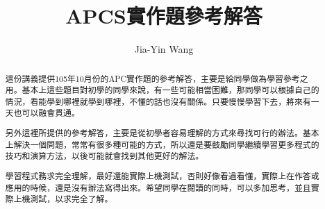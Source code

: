 \documentclass[12pt,a4paper]{article}
\begin{document}
\title{APCS實作題參考解答}
\author{Jia-Yin Wang}
\maketitle

\begin{abstract}
這份講義提供105年10月份的APC實作題的參考解答，主要是給同學做為學習參考之用。基本上這些題目對初學的同學來說，有一些可能相當困難，那同學可以根據自己的情況，看能學到哪裡就學到哪裡，不懂的話也沒有關係。只要慢慢學習下去，將來有一天也可以融會貫通。

另外這裡所提供的參考解答，主要是從初學者容易理解的方式來尋找可行的辦法。基本上解決一個問題，常常有很多種可能的方式，所以還是要鼓勵同學繼續學習更多程式的技巧和演算方法，以後可能就會找到其他更好的解法。

學習程式務求完全理解，最好還能實際上機測試，否則好像看過看懂，實際上在作答或應用的時候，還是沒有辦法寫得出來。希望同學在閱讀的同時，可以多加思考，並且實際上機測試，以求完全了解。
\end{abstract}
%
%


\newpage

\newpage

\newpage

\end{document}
